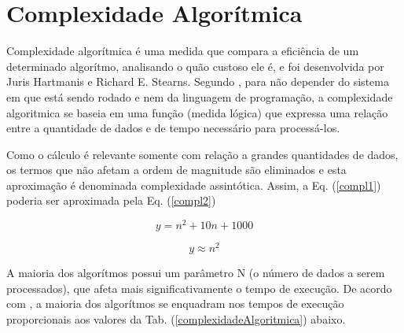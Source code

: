 \section{Complexidade Algorítmica}

	Complexidade algorítmica é uma medida que compara a eficiência de um determinado algorítmo, analisando o quão custoso ele é,  e foi desenvolvida por Juris Hartmanis e Richard E. Stearns. Segundo  \cite{complexidade}, para não depender do sistema em que está sendo rodado e nem da linguagem de programação, a complexidade algoritmica se baseia em uma função (medida lógica) que expressa uma relação entre a quantidade de dados e de tempo necessário para processá-los.

	 Como o cálculo é relevante somente com relação a grandes quantidades de dados, os termos que não afetam a ordem de magnitude são eliminados e esta aproximação é denominada complexidade assintótica. Assim, a  Eq. 
(\ref{compl1}) poderia ser aproximada pela  Eq. (\ref{compl2})

	\begin{equation}
		y = n^{2} +10 n + 1000
	\label{compl1}
	\end{equation}

	\begin{equation}
		y \approx  n^{2} 
	\label{compl2}
	\end{equation}

	A maioria dos algorítmos possui um parâmetro N (o número de dados a serem processados), que afeta mais significativamente o tempo de execução. De acordo com \cite{complexidade2}, a maioria dos algorítmos se enquadram nos tempos de execução proporcionais aos valores da Tab. (\ref{complexidadeAlgoritmica}) abaixo.


